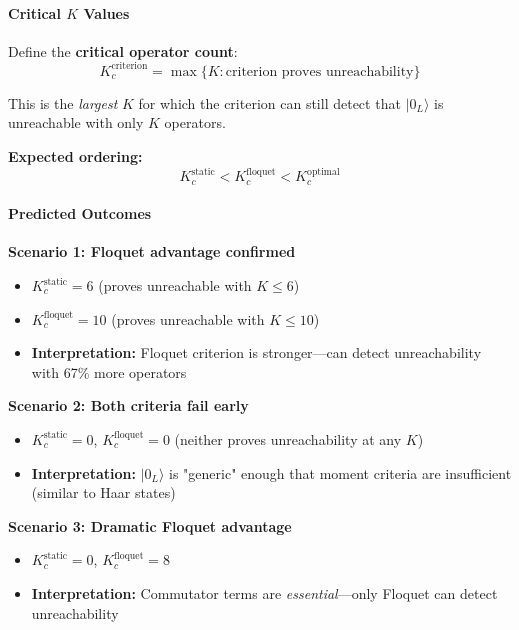\paragraph{Critical $K$ Values}

Define the \textbf{critical operator count}:
\begin{equation}
K_c^{\text{criterion}} = \max \{ K : \text{criterion proves unreachability} \}
\end{equation}

This is the \emph{largest} $K$ for which the criterion can still detect that $|0_L\rangle$ is unreachable with only $K$ operators.

\textbf{Expected ordering:}
\begin{equation}
K_c^{\text{static}} < K_c^{\text{floquet}} < K_c^{\text{optimal}}
\end{equation}

\paragraph{Predicted Outcomes}

\textbf{Scenario 1: Floquet advantage confirmed}
\begin{itemize}
\item $K_c^{\text{static}} = 6$ (proves unreachable with $K \leq 6$)
\item $K_c^{\text{floquet}} = 10$ (proves unreachable with $K \leq 10$)
\item \textbf{Interpretation:} Floquet criterion is stronger—can detect unreachability with 67\% more operators
\end{itemize}

\textbf{Scenario 2: Both criteria fail early}
\begin{itemize}
\item $K_c^{\text{static}} = 0$, $K_c^{\text{floquet}} = 0$ (neither proves unreachability at any $K$)
\item \textbf{Interpretation:} $|0_L\rangle$ is "generic" enough that moment criteria are insufficient (similar to Haar states)
\end{itemize}

\textbf{Scenario 3: Dramatic Floquet advantage}
\begin{itemize}
\item $K_c^{\text{static}} = 0$, $K_c^{\text{floquet}} = 8$
\item \textbf{Interpretation:} Commutator terms are \emph{essential}—only Floquet can detect unreachability
\end{itemize}

